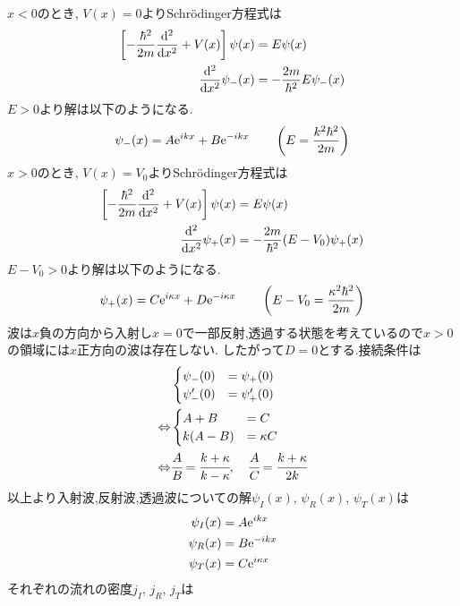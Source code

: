 \subsubsection{}
$x<0$のとき, $V(x)=0$よりSchr\"{o}dinger方程式は
\begin{align}
  \left[-\frac{\hbar^2}{2m}\frac{\rm d^2}{{\rm d}x^2}+V(x)\right]\psi(x)&=E\psi(x)\\
  \frac{\rm d^2}{{\rm d}x^2}\psi_-(x)&=-\frac{2m}{\hbar^2}E\psi_-(x)
\end{align}
$E>0$より解は以下のようになる.
\begin{align}
  \psi_-(x)=A{\rm e}^{ikx}+B{\rm e}^{-ikx}\qquad\left(E=\frac{k^2\hbar^2}{2m}\right)
\end{align}
$x>0$のとき, $V(x)=V_0$よりSchr\"{o}dinger方程式は
\begin{align}
  \left[-\frac{\hbar^2}{2m}\frac{\rm d^2}{{\rm d}x^2}+V(x)\right]\psi(x)&=E\psi(x)\\
  \frac{\rm d^2}{{\rm d}x^2}\psi_+(x)&=-\frac{2m}{\hbar^2}(E-V_0)\psi_+(x)
\end{align}
$E-V_0>0$より解は以下のようになる.
\begin{align}
  \psi_+(x)=C{\rm e}^{i\kappa x}+D{\rm e}^{-i\kappa x}\qquad\left(E-V_0=\frac{\kappa^2\hbar^2}{2m}\right)
\end{align}
波は$x$負の方向から入射し$x=0$で一部反射,透過する状態を考えているので$x>0$の領域には$x$正方向の波は存在しない.
したがって$D=0$とする.接続条件は
\begin{align}
  &\begin{cases}
    \psi_-(0)&=\psi_+(0)\\
    \psi_-'(0)&=\psi_+'(0)
  \end{cases}\\\Leftrightarrow
  &\begin{cases}
    A+B&=C\\
    k(A-B)&=\kappa C
  \end{cases}\\\Leftrightarrow
    &\cfrac{A}{B}=\cfrac{k+\kappa}{k-\kappa},\quad
    \cfrac{A}{C}=\cfrac{k+\kappa}{2k}
\end{align}
以上より入射波,反射波,透過波についての解$\psi_I(x)$, $\psi_R(x)$, $\psi_T(x)$は
\begin{align}
  \psi_I(x)&=A{\rm e}^{ikx}\\
  \psi_R(x)&=B{\rm e}^{-ikx}\\
  \psi_T(x)&=C{\rm e}^{i\kappa x}
\end{align}
それぞれの流れの密度$j_I$, $j_R$, $j_T$は
